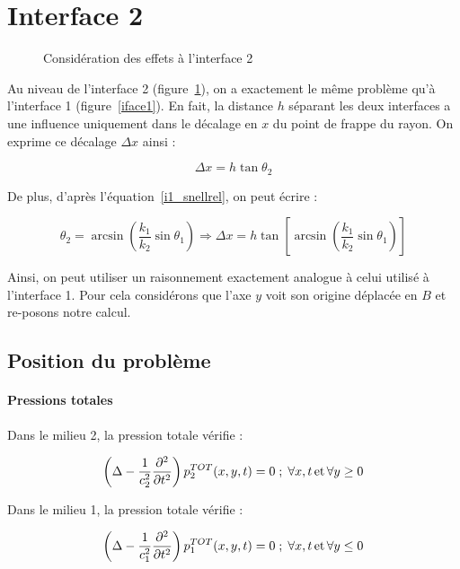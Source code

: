 \section{Interface 2}

\begin{figure}[!h]
    \centering{}
    \caption{\label{iface2} Considération des effets à l'interface 2}
\end{figure}

Au niveau de l'interface 2 (figure~\ref{iface2}), on a exactement le même problème qu'à l'interface 1
(figure~\ref{iface1}). En fait, la distance $h$ séparant les deux interfaces a une influence uniquement dans le décalage
en $x$ du point de frappe du rayon. On exprime ce décalage $\Delta x$ ainsi :

\[
\Delta x = h\tan\theta_2
\]

De plus, d'après l'équation~\eqref{i1_snellrel}, on peut écrire :

\[
\theta_2 = \arcsin\left(\frac{k_1}{k_2}\sin\theta_1\right) \Rightarrow \Delta x = h\tan\left[\arcsin\left(\frac{k_1}{k_2}\sin\theta_1\right)\right]
\]

Ainsi, on peut utiliser un raisonnement exactement analogue à celui utilisé à l'interface 1. Pour cela considérons que
l'axe $y$ voit son origine déplacée en $B$ et re-posons notre calcul.


\subsection{Position du problème}

\paragraph{Pressions totales} Dans le milieu 2, la pression totale vérifie :

\begin{equation}
    \left(\Delta - \frac{1}{c_2^2}\frac{\partial^2}{\partial t^2}\right)p^{TOT}_2(x,y,t) = 0 \;;\; \forall x,t \,\mathrm{et}\, \forall y \geq 0 \label{i2_prop2}
\end{equation}


Dans le milieu 1, la pression totale vérifie :

\begin{equation}
    \left(\Delta - \frac{1}{c_1^2}\frac{\partial^2}{\partial t^2}\right)p^{TOT}_1(x,y,t) = 0 \;;\; \forall x,t\,\mathrm{et}\,\forall y \leq 0 \label{i2_prop2}
\end{equation}


